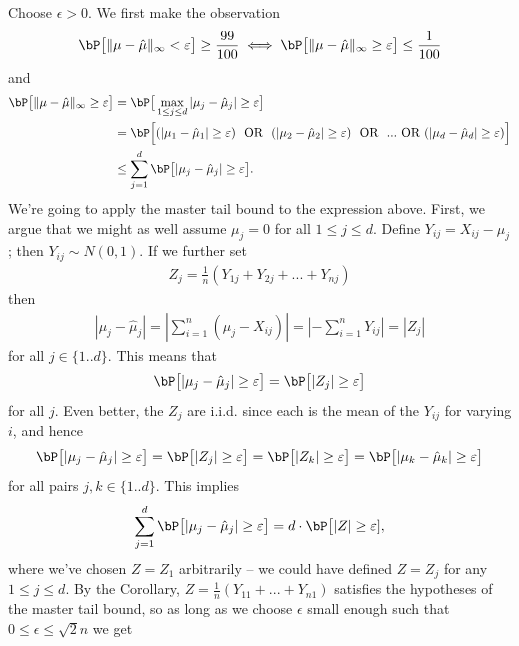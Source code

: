 \begin{homework}[e]
\begin{prf}
    Choose $\epsilon > 0$. We first make the observation
    \begin{align*}
      \bP\big[\|\mu - \hat\mu\|_\infty < \epsilon\big] \geq \frac{99}{100} \iff \bP\big[\|\mu - \hat\mu\|_\infty \geq \epsilon\big] \leq \frac{1}{100}
    \end{align*}
    and
    \begin{align*}
      \bP\big[\|\mu - \hat\mu\|_\infty \geq \epsilon\big] 
      &= \bP\big[\max_{1\leq j \leq d}|\mu_j - \hat\mu_j| \geq \epsilon\big] \\
      &= \bP\Big[(|\mu_1 - \hat\mu_1| \geq \epsilon) ~\text{ OR } ~(|\mu_2 - \hat\mu_2| \geq \epsilon)~\text{ OR } ~ ... ~\text{OR}~ (|\mu_d - \hat\mu_d|\geq \epsilon)\Big]\\
      &\leq \sum_{j = 1}^d \bP\big[|\mu_j - \hat\mu_j| \geq \epsilon\big].
    \end{align*}
    We're going to apply the master tail bound to the expression above. First, we argue that we might as well assume $\mu_j = 0$ for all $1\leq j\leq d$. Define $Y_{ij} = X_{ij} - \mu_j$; then $Y_{ij} \sim N(0,1)$. If we further set
    \begin{align*}
      Z_j = \frac{1}{n}(Y_{1j} + Y_{2j}+...+Y_{nj})
    \end{align*}
    then
    \begin{align*}
      |\mu_j -\hat\mu_j| = \left|\sum_{i=1}^n(\mu_j - X_{ij})\right| = \left|-\sum_{i=1}^n Y_{ij}\right| = |Z_j|
    \end{align*}
    for all $j\in \{1..d\}$. This means that
    \begin{align*}
      \bP\big[|\mu_j-\hat\mu_j| \geq \epsilon\big] = \bP\big[|Z_j| \geq \epsilon\big]
    \end{align*}
    for all $j$. Even better, the $Z_j$ are i.i.d. since each is the mean of the $Y_{ij}$ for varying $i$, and hence
    \begin{align*} 
      \bP\big[|\mu_j-\hat\mu_j| \geq \epsilon\big] = \bP\big[|Z_j| \geq \epsilon\big] = \bP\big[|Z_{k}| \geq \epsilon\big] = \bP\big[|\mu_{k}-\hat\mu_{k}| \geq \epsilon\big]
    \end{align*}
    for all pairs $j,k \in \{1..d\}$. This implies
    \begin{align*}
      \sum_{j = 1}^d \bP\big[|\mu_j - \hat\mu_j| \geq \epsilon\big] = d\cdot \bP\big[|Z|\geq \epsilon],
    \end{align*}
    where we've chosen $Z = Z_1$ arbitrarily -- we could have defined $Z = Z_j$ for any $1\leq j\leq d$. By the Corollary, $Z = \frac{1}{n}(Y_{11} + ... + Y_{n1})$ satisfies the hypotheses of the master tail bound, so as long as we choose $\epsilon$ small enough such that $0 \leq \epsilon \leq \sqrt{2}n$ we get

\end{prf}
\end{homework}
